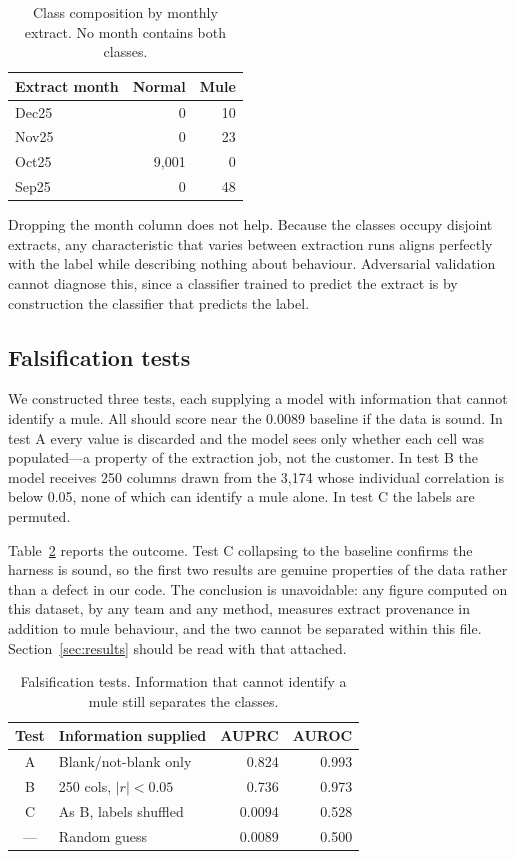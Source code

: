 \documentclass{article}
\begin{document}
\begin{table}[htb]
\centering
\caption{Class composition by monthly extract. No month contains both classes.}
\label{tab:months}
\vspace{1ex}
\begin{tabular}{lrr}
\toprule
Extract month & Normal & Mule \\
\midrule
Dec25 & 0 & 10 \\
Nov25 & 0 & 23 \\
Oct25 & 9,001 & 0 \\
Sep25 & 0 & 48 \\
\bottomrule
\end{tabular}
\end{table}

Dropping the month column does not help. Because the classes occupy disjoint
extracts, any characteristic that varies between extraction runs aligns perfectly
with the label while describing nothing about behaviour. Adversarial validation
cannot diagnose this, since a classifier trained to predict the extract is by
construction the classifier that predicts the label.

\subsection{Falsification tests}

We constructed three tests, each supplying a model with information that cannot
identify a mule. All should score near the 0.0089 baseline if the data is
sound. In test A every value is discarded and the model sees only whether each
cell was populated---a property of the extraction job, not the customer. In test
B the model receives 250 columns drawn from the 3,174 whose
individual correlation is below 0.05, none of which can identify a mule alone. In
test C the labels are permuted.

Table~\ref{tab:falsify} reports the outcome. Test C collapsing to the baseline
confirms the harness is sound, so the first two results are genuine properties of
the data rather than a defect in our code. The conclusion is unavoidable: any
figure computed on this dataset, by any team and any method, measures extract
provenance in addition to mule behaviour, and the two cannot be separated within
this file. Section~\ref{sec:results} should be read with that attached.

\begin{table}[htb]
\centering
\caption{Falsification tests. Information that cannot identify a mule still
separates the classes.}
\label{tab:falsify}
\vspace{1ex}
\begin{tabular}{clrr}
\toprule
Test & Information supplied & AUPRC & AUROC \\
\midrule
A & Blank/not-blank only & 0.824 & 0.993 \\
B & 250 cols, $|r| < 0.05$ & 0.736 & 0.973 \\
C & As B, labels shuffled & 0.0094 & 0.528 \\
\midrule
--- & Random guess & 0.0089 & 0.500 \\
\bottomrule
\end{tabular}
\end{table}
\end{document}
